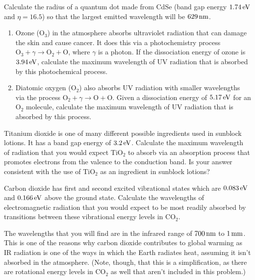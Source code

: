 
\begin{problem}
Calculate the radius of a quantum dot made from CdSe (band gap energy
$1.74\,\mbox{eV}$ and $\eta = 16.5$) so that the largest emitted wavelength
will be $629\,\mbox{nm}$.
\label{prob:QuantumDot}
\end{problem}

\newpage


\begin{problem}
\begin{enumerate}
\item Ozone (O$_3$) in the atmosphere absorbs ultraviolet radiation
that can damage the skin and cause cancer. It does this via a photochemistry
process $\mbox{O}_3 + \gamma \rightarrow \mbox{O}_2 + \mbox{O}$, 
where $\gamma$ is a photon.  If the dissociation energy of ozone is 
$3.94\,\mbox{eV}$, calculate the maximum wavelength of UV radiation
that is absorbed by this photochemical process.
\item Diatomic oxygen (O$_2$) also absorbs UV radiation with smaller
wavelengths via the process $\mbox{O}_2 + \gamma \rightarrow 
\mbox{O} + \mbox{O}$.
Given a dissociation energy of $5.17\,\mbox{eV}$ for an O$_2$ molecule,
calculate the maximum wavelength of UV radiation that is absorbed by
this process.
\end{enumerate}
\label{prob:UVAbsorption}
\end{problem}


\begin{problem}
Titanium dioxide is one of many different possible ingredients used in
sunblock lotions. It has a band gap energy of $3.2\,\mbox{eV}$. Calculate the
maximum wavelength of radiation that you would expect TiO$_2$ to absorb
via an absorption process that promotes electrons from the valence
to the conduction band. Is your answer consistent with the use of TiO$_2$
as an ingredient in sunblock lotions?
\end{problem}


\begin{problem}
Carbon dioxide has first and second excited vibrational states which 
are $0.083\,\mbox{eV}$
and $0.166\,\mbox{eV}$ above the ground state. Calculate the wavelengths of
electromagnetic radiation that you would expect to be most readily
absorbed by transitions between these vibrational energy levels in CO$_2$.

The wavelengths that you will find are in the infrared range of
$700\,\mbox{nm}$ to $1\,\mbox{mm}$. This is one of the reasons 
why carbon dioxide contributes
to global warming as IR radiation is one of the ways in which the Earth
radiates heat, assuming it isn't absorbed in the atmosphere. (Note, though,
that this is a simplification, as there are rotational energy levels
in CO$_2$ as well that aren't included in this problem.)
\label{prob:CO2}
\end{problem}

